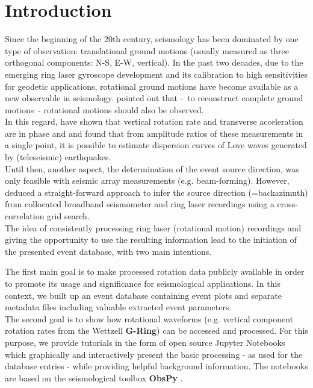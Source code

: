 \documentclass[12pt,reqno,letter]{article}
\begin{document}
\section*{Introduction}
Since the beginning of the 20th century, seismology has been dominated by one type of observation: translational ground motions (usually measured as three orthogonal components: N-S, E-W, vertical). In the past two decades, due to the emerging ring laser gyroscope development and its calibration to high sensitivities \citep{Stedman1997,Schreiber2013} for geodetic applications, rotational ground motions have become available as a new observable in seismology.
\cite{AkiRichards2002} pointed out that -~to reconstruct complete ground motions~- rotational motions should also be observed.
\\ 
In this regard, \cite{McLeod1998, Pancha2000} have shown that vertical rotation rate and transverse acceleration are in phase and \cite{Igel2005,Igel2007} and \cite{Kurrle2010} found that from amplitude ratios of these measurements in a single point, it is possible to estimate dispersion curves of Love waves generated by (teleseismic) earthquakes.\\
Until then, another aspect, the determination of the event source direction, was only feasible with seismic array measurements (e.g. beam-forming). However, \cite{Igel2007} deduced a straight-forward approach to infer the source direction (=backazimuth) from  collocated broadband seismometer and ring laser recordings using a cross-correlation grid search.\\
The idea of consistently processing ring laser (rotational motion) recordings and giving the opportunity to use the resulting information lead to the initiation of the presented event database, with two main intentions.

The first main goal is to make processed rotation data publicly available in order to promote its usage and significance for seismological applications. In this context, we built up an event database containing event plots and separate metadata files including valuable extracted event parameters.\\
The second goal is to show how rotational waveforms (e.g. vertical component rotation rates from the Wettzell \textbf{G-Ring}) can be accessed and processed. For this purpose, we provide tutorials in the form of open source Jupyter Notebooks \citep{Perez2007} which graphically and interactively present the basic processing - as used for the database entries - while providing helpful background information. The notebooks are based on the seismological toolbox \textbf{ObsPy} \citep{Megies2011,Krischer2015}.
\end{document}
